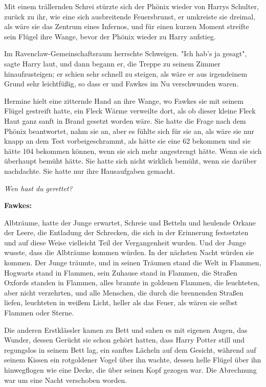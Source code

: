 {Mit einem trällernden Schrei stürzte sich der Phönix wieder von Harrys Schulter, zurück zu ihr, wie eine sich ausbreitende Feuersbrunst, er umkreiste sie dreimal, als wäre sie das Zentrum eines Infernos, und für einen kurzen Moment streifte sein Flügel ihre Wange, bevor der Phönix wieder zu Harry aufstieg.

Im Ravenclaw-Gemeinschaftsraum herrschte Schweigen. "Ich hab's ja gesagt", sagte Harry laut, und dann begann er, die Treppe zu seinem Zimmer hinaufzusteigen; er schien sehr schnell zu steigen, als wäre er aus irgendeinem Grund sehr leichtfüßig, so dass er und Fawkes im Nu verschwunden waren.

Hermine hielt eine zitternde Hand an ihre Wange, wo Fawkes sie mit seinem Flügel gestreift hatte, ein Fleck Wärme verweilte dort, als ob dieser kleine Fleck Haut ganz sanft in Brand gesetzt worden wäre. Sie hatte die Frage nach dem Phönix beantwortet, nahm sie an, aber es fühlte sich für sie an, als wäre sie nur knapp an dem Test vorbeigeschrammt, als hätte sie eine 62 bekommen und sie hätte 104 bekommen können, wenn sie sich mehr angestrengt hätte. Wenn sie sich überhaupt bemüht hätte. Sie hatte sich nicht wirklich bemüht, wenn sie darüber nachdachte. Sie hatte nur ihre Hausaufgaben gemacht.

\emph{Wen hast du gerettet?}

\textbf{Fawkes:}

Albträume, hatte der Junge erwartet, Schreie und Betteln und heulende Orkane der Leere, die Entladung der Schrecken, die sich in der Erinnerung festsetzten und auf diese Weise vielleicht Teil der Vergangenheit wurden. Und der Junge wusste, dass die Albträume kommen würden. In der nächsten Nacht würden sie kommen. Der Junge träumte, und in seinen Träumen stand die Welt in Flammen, Hogwarts stand in Flammen, sein Zuhause stand in Flammen, die Straßen Oxfords standen in Flammen, alles brannte in goldenen Flammen, die leuchteten, aber nicht verzehrten, und alle Menschen, die durch die brennenden Straßen liefen, leuchteten in weißem Licht, heller als das Feuer, als wären sie selbst Flammen oder Sterne.

Die anderen Erstklässler kamen zu Bett und sahen es mit eigenen Augen, das Wunder, dessen Gerücht sie schon gehört hatten, dass Harry Potter still und regungslos in seinem Bett lag, ein sanftes Lächeln auf dem Gesicht, während auf seinem Kissen ein rotgoldener Vogel über ihn wachte, dessen helle Flügel über ihn hinwegflogen wie eine Decke, die über seinen Kopf gezogen war. Die Abrechnung war um eine Nacht verschoben worden.

}
